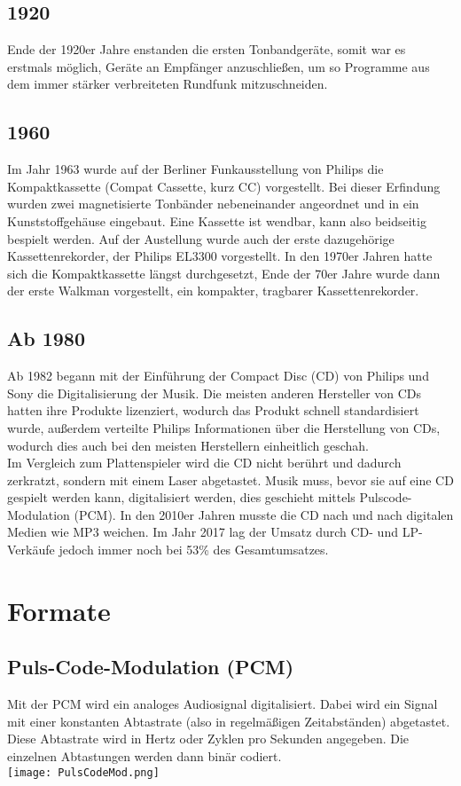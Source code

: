\documentclass{article}
\begin{document}
	\subsection*{1920}
	Ende der 1920er Jahre enstanden die ersten Tonbandgeräte, somit war es erstmals möglich, Geräte an Empfänger anzuschließen, um so Programme aus dem immer stärker verbreiteten Rundfunk mitzuschneiden. \cite{Reininger1928}
	
	\subsection*{1960}
	Im Jahr 1963 wurde auf der Berliner Funkausstellung von Philips die Kompaktkassette (Compat Cassette, kurz CC) vorgestellt. Bei dieser Erfindung wurden zwei magnetisierte Tonbänder nebeneinander angeordnet und in ein Kunststoffgehäuse eingebaut. Eine Kassette ist wendbar, kann also beidseitig bespielt werden. Auf der Austellung wurde auch der erste dazugehörige Kassettenrekorder, der Philips EL3300 vorgestellt. In den 1970er Jahren hatte sich die Kompaktkassette längst durchgesetzt, Ende der 70er Jahre wurde dann der erste Walkman vorgestellt, ein kompakter, tragbarer Kassettenrekorder. \cite{Disc4}
	
	\subsection*{Ab 1980}
	Ab 1982 begann mit der Einführung der Compact Disc (CD) von Philips und Sony die Digitalisierung der Musik. Die meisten anderen Hersteller von CDs hatten ihre Produkte lizenziert, wodurch das Produkt schnell standardisiert wurde, außerdem verteilte Philips Informationen über die Herstellung von CDs, wodurch dies auch bei den meisten Herstellern einheitlich geschah. \cite{CDeins} \\
	Im Vergleich zum Plattenspieler wird die CD nicht berührt und dadurch zerkratzt, sondern mit einem Laser abgetastet. Musik muss, bevor sie auf eine CD gespielt werden kann, digitalisiert werden, dies geschieht mittels Pulscode-Modulation (PCM). In den 2010er Jahren musste die CD nach und nach digitalen Medien wie MP3 weichen. Im Jahr 2017 lag der Umsatz durch CD- und LP-Verkäufe jedoch immer noch bei 53\% des Gesamtumsatzes. \cite{CDzwei}
	
	\section*{Formate}
	\subsection*{Puls-Code-Modulation (PCM)}
	Mit der PCM wird ein analoges Audiosignal digitalisiert. Dabei wird ein Signal mit einer konstanten Abtastrate (also in regelmäßigen Zeitabständen) abgetastet. Diese Abtastrate wird in Hertz oder Zyklen pro Sekunden angegeben. Die einzelnen Abtastungen werden dann binär codiert. \cite{PCMtext} \\
	\texttt{[image: PulsCodeMod.png]} \cite{PCMimg} \\
	
\end{document}

